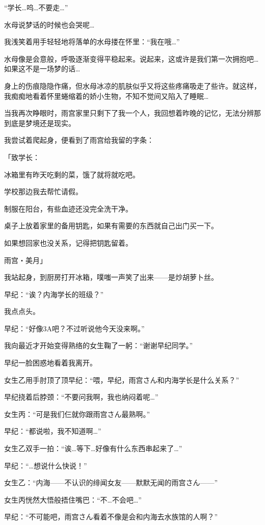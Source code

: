 “学长…呜…不要走…”

水母说梦话的时候也会哭呢…

我浅笑着用手轻轻地将落单的水母搂在怀里：“我在哦…”

水母像是会意般，呼吸逐渐变得平稳起来。说起来，这或许是我们第一次拥抱吧…如果这不是一场梦的话…

身上的伤痕隐隐作痛，但水母冰凉的肌肤似乎又将这些疼痛吸走了些许。就这样，我痴痴地看着怀里蜷缩着的娇小生物，不知不觉间又陷入了睡眠…

当我再次睁眼时，雨宫家里只剩下了我一个人，我回想着昨晚的记忆，无法分辨那到底是梦境还是现实。

我尝试着爬起身，便看到了雨宫给我留的字条：

「致学长：

冰箱里有昨天吃剩的菜，饿了就将就吃吧。

学校那边我去帮忙请假。

制服在阳台，有些血迹还没完全洗干净。

桌子上放着家里的备用钥匙，如果有需要的东西就自己出门买一下。

如果想回家也没关系，记得把钥匙留着。

雨宫・美月」

我站起身，到厨房打开冰箱，噗嗤一声笑了出来——是炒胡萝卜丝。\carrot

\cutlinef{\turned}

\newday{\cloudy}

早纪：“诶？内海学长的班级？”

我点点头。

早纪：“好像3A吧？不过听说他今天没来啊。”

我向最近才开始变得熟络的女生鞠了一躬：“谢谢早纪同学。”

早纪一脸困惑地看着我离开。

女生乙用手肘顶了顶早纪：“喂，早纪，雨宫さん和内海学长是什么关系？”

早纪挠着后脖颈：“不要问我啊，我也纳闷着呢…”

女生丙：“可是我们仨就你跟雨宫さん最熟啊。”

早纪：“都说啦，我不知道啊…”

女生乙双手一拍：“诶…等下…好像有什么东西串起来了…”

早纪：“…想说什么快说！”

女生乙：“内海——不认识的绯闻女友——默默无闻的雨宫さん——”

女生丙恍然大悟般捂住嘴巴：“不…不会吧…”

早纪：“不可能吧，雨宫さん看着不像是会和内海去水族馆的人啊？”

